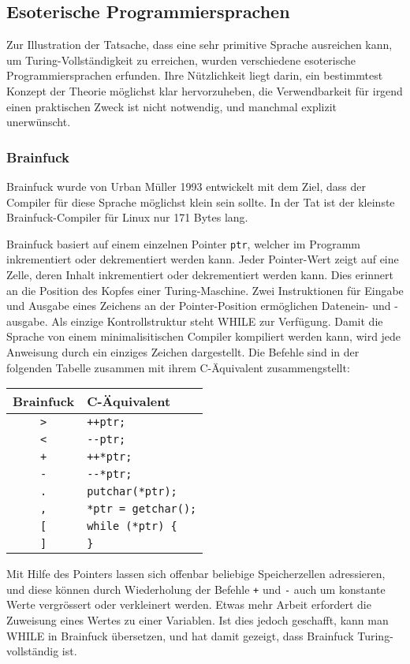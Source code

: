 \subsection{Esoterische Programmiersprachen}
%
Zur Illustration der Tatsache, dass eine sehr primitive Sprache
ausreichen kann, um Turing-Vollständigkeit zu erreichen, wurden
verschiedene esoterische Programmiersprachen erfunden.
Ihre Nützlichkeit liegt darin, ein bestimmtest Konzept der Theorie
möglichst klar hervorzuheben, die Verwendbarkeit für irgend einen
praktischen Zweck ist nicht notwendig, und manchmal explizit unerwünscht.

\subsubsection{Brainfuck}
%
Brainfuck
wurde von Urban Müller 1993 entwickelt mit dem Ziel, dass der
Compiler für diese Sprache möglichst klein sein sollte. In der
Tat ist der kleinste Brainfuck-Compiler für Linux nur 171 Bytes
lang.

Brainfuck basiert auf einem einzelnen Pointer {\tt ptr}, welcher
im Programm inkrementiert oder dekrementiert werden kann.
Jeder Pointer-Wert zeigt auf eine Zelle, deren Inhalt inkrementiert
oder dekrementiert werden kann.
Dies erinnert an die Position des Kopfes einer Turing-Maschine.
Zwei Instruktionen für Eingabe und Ausgabe eines Zeichens
an der Pointer-Position ermöglichen Datenein- und -ausgabe.
Als einzige Kontrollstruktur steht WHILE zur Verfügung. Damit
die Sprache von einem minimalisitischen Compiler kompiliert
werden kann, wird jede Anweisung durch ein einziges Zeichen
dargestellt. Die Befehle sind in der folgenden Tabelle
zusammen mit ihrem C-Äquivalent zusammengstellt:
\begin{center}
\begin{tabular}{|c|l|}
\hline
Brainfuck&C-Äquivalent\\
\hline
{\tt >}&\verb/++ptr;/\\
{\tt <}&\verb/--ptr;/\\
{\tt +}&\verb/++*ptr;/\\
{\tt -}&\verb/--*ptr;/\\
{\tt .}&\verb/putchar(*ptr);/\\
{\tt ,}&\verb/*ptr = getchar();/\\
{\tt [}&\verb/while (*ptr) {/\\
{\tt ]}&\verb/}/\\
\hline
\end{tabular}
\end{center}
Mit Hilfe des Pointers lassen sich offenbar beliebige Speicherzellen
adressieren, und diese können durch Wiederholung der Befehle {\tt +}
und {\tt -} auch um konstante Werte vergrössert
oder verkleinert werden. Etwas mehr Arbeit erfordert die Zuweisung
eines Wertes zu einer Variablen. Ist dies jedoch geschafft, kann
man WHILE in Brainfuck übersetzen, und hat damit gezeigt, dass
Brainfuck Turing-vollständig ist.

